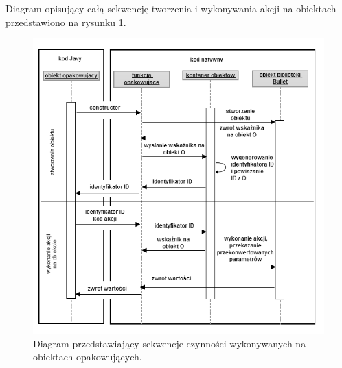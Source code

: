 Diagram opisujący całą sekwencję tworzenia i wykonywania akcji na
obiektach przedstawiono na rysunku \ref{fig:DiagWrapper}.

\begin{figure}
\centering
\includegraphics[width=\textwidth]{./img/sequenceDiagram.png}
\caption{Diagram przedstawiający sekwencje czynności wykonywanych na obiektach
opakowujących.}
\label{fig:DiagWrapper}
\end{figure}

\newpage
